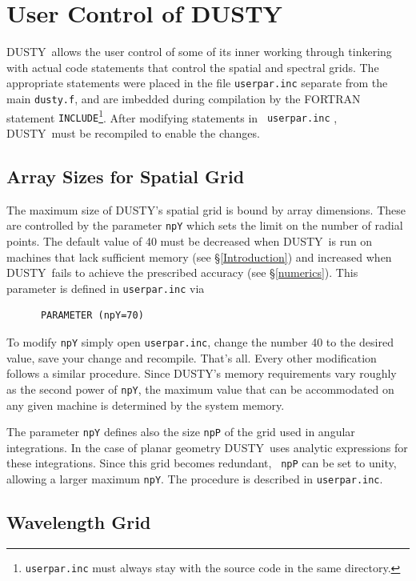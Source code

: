 \documentclass[11pt]{article}
\def\D  {{\sf DUSTY}}
\begin{document}
\section{User Control of \D}
\label{user_control}

\D\ allows the user control of some of its inner working through tinkering with
actual code statements that control the spatial and spectral grids. The
appropriate statements were placed in the file {\tt userpar.inc} separate from
the main {\tt dusty.f}, and are imbedded during compilation by the FORTRAN
statement {\tt INCLUDE}\footnote{{\tt userpar.inc} must always stay with the
source code in the same directory.}. After modifying statements in {\tt
userpar.inc} , \D\ must be recompiled to enable the changes.

\subsection{Array Sizes for Spatial Grid}
 \label{Memory}

The maximum size of \D's spatial grid is bound by array dimensions. These are
controlled by the parameter {\tt npY} which sets the limit on the number of
radial points.  The default value of 40 must be decreased when \D\ is run on
machines that lack sufficient memory (see \S\ref{Introduction}) and increased
when \D\ fails to achieve the prescribed accuracy (see \S\ref{numerics}). This
parameter is defined in {\tt userpar.inc} via
\begin{verbatim}
      PARAMETER (npY=70)
\end{verbatim}
To modify {\tt npY} simply open {\tt userpar.inc}, change the number 40 to the
desired value, save your change and recompile.  That's all.  Every other
modification follows a similar procedure. Since \D's memory requirements vary
roughly as the second power of {\tt npY}, the maximum value that can be
accommodated on any given machine is determined by the system memory.

The parameter {\tt npY} defines also the size {\tt npP} of the grid used in
angular integrations.  In the case of planar geometry \D\ uses analytic
expressions for these integrations.  Since this grid becomes redundant, {\tt
npP} can be set to unity, allowing a larger maximum {\tt npY}.  The procedure
is described in {\tt userpar.inc}.

\subsection{Wavelength Grid} \label{F-Grid}
\end{document}
